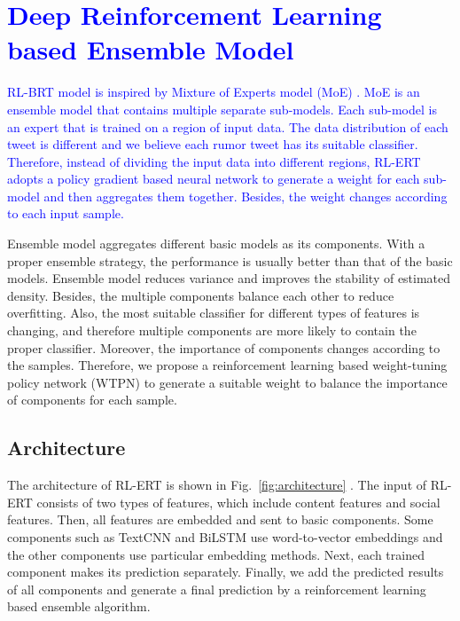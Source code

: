 \documentclass[review]{elsarticle}
\begin{document}
\section{\textcolor{blue}{Deep Reinforcement Learning based Ensemble Model}}
\label{sec:model}

\textcolor{blue}{RL-BRT model is inspired by Mixture of Experts model (MoE) \cite{DBLP:conf/nips/MillerU96}. MoE is an ensemble model that contains multiple separate sub-models. Each sub-model is an expert that is trained on a region of input data. The data distribution of each tweet is different and we believe each rumor tweet has its suitable classifier. Therefore, instead of dividing the input data into different regions, RL-ERT adopts a policy gradient based neural network to generate a weight for each sub-model and then aggregates them together. Besides, the weight changes according to each input sample.}

Ensemble model \cite{DBLP:journals/ml/Breiman96b} aggregates different basic models as its components. With a proper ensemble strategy, the performance is usually better than that of the basic models. Ensemble model reduces variance and improves the
stability of estimated density. Besides, the multiple components balance each other to reduce overfitting. Also, the most suitable classifier for different types of features is changing, and therefore multiple components are more likely to contain the proper classifier. Moreover, the importance of components changes according to the samples. Therefore, we propose a reinforcement learning based weight-tuning policy network (WTPN) to generate a suitable weight to balance the importance of components for each sample. 

\subsection{Architecture}
\label{sec:architecture}
The architecture of RL-ERT is shown in Fig.~\ref{fig:architecture} . The input of RL-ERT consists of two types of features, which include content features and social features. Then, all features are embedded and sent to basic components.  Some components such as TextCNN and BiLSTM use word-to-vector embeddings and the other components use particular embedding methods. Next, each trained component makes its prediction separately. Finally, we add the predicted results of all components and generate a final prediction by a reinforcement learning based ensemble algorithm.
\end{document}

